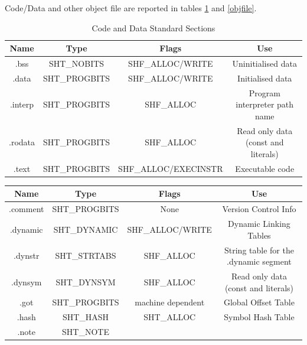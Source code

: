Code/Data and other object file are reported in tables \ref{codedata} and \ref{objfile}.  \begin{table}[!htbp]
    \begin{center} \begin{tabular}{|c|c|c|c|} \hline \textbf{Name} & \textbf{Type} & \textbf{Flags} &
        \textbf{Use}\\ \hline {\ttfamily .bss} & {\ttfamily SHT\_NOBITS} & {\ttfamily SHF\_ALLOC/WRITE} &
        Uninitialised data\\ \hline {\ttfamily .data} & {\ttfamily SHT\_PROGBITS} & {\ttfamily SHF\_ALLOC/WRITE}
        & Initialised data\\ \hline {\ttfamily .interp} & {\ttfamily SHT\_PROGBITS} & {\ttfamily SHF\_ALLOC} &
        Program interpreter path name\\ \hline {\ttfamily .rodata} & {\ttfamily SHT\_PROGBITS} & {\ttfamily
        SHF\_ALLOC} & Read only data (const and literals)\\ \hline {\ttfamily .text} & {\ttfamily SHT\_PROGBITS}
        & {\ttfamily SHF\_ALLOC/EXECINSTR} & Executable code\\ \hline \end{tabular} \caption{Code and Data
Standard Sections} \label{codedata} \end{center} \end{table} \begin{table}[!htbp] \begin{center}
    \begin{tabular}{|c|c|c|c|} \hline \textbf{Name} & \textbf{Type} & \textbf{Flags} & \textbf{Use}\\ \hline
        {\ttfamily .comment} & {\ttfamily SHT\_PROGBITS} & {\ttfamily None} & Version Control Info\\ \hline
        {\ttfamily .dynamic} & {\ttfamily SHT\_DYNAMIC} & {\ttfamily SHF\_ALLOC/WRITE} & Dynamic Linking
        Tables\\ \hline {\ttfamily .dynstr} & {\ttfamily SHT\_STRTABS} & {\ttfamily SHF\_ALLOC} & String table
        for the {\ttfamily .dynamic} segment\\ \hline {\ttfamily .dynsym} & {\ttfamily SHT\_DYNSYM} & {\ttfamily
        SHF\_ALLOC} & Read only data (const and literals)\\ \hline {\ttfamily .got} & {\ttfamily SHT\_PROGBITS}
        & {\ttfamily machine dependent} & Global Offset Table\\ \hline {\ttfamily .hash} & {\ttfamily SHT\_HASH}
        & {\ttfamily SHT\_ALLOC} & Symbol Hash Table\\ \hline {\ttfamily .note} & {\ttfamily SHT\_NOTE} &

\end{tabular}
\end{center}
\end{table}
